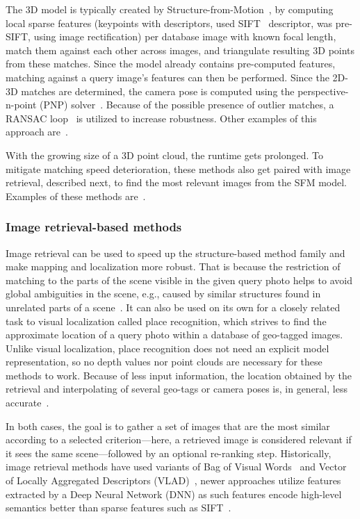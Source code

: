 The 3D model is typically created by
Structure-from-Motion~\citep{SfM, schoenberger2016mvs}, by computing local sparse features (keypoints with descriptors,
\citet{LoweLocalization} used SIFT~\citep{SIFT} descriptor, \citet{PreSIFT} was pre-SIFT, using image rectification)
per database image with known focal length, match them against each other across images, and triangulate resulting 3D points
from these matches. Since the model already contains pre-computed features, matching against
a query image's features can then be performed. Since the 2D-3D matches are determined, the camera pose
is computed using the perspective-n-point (PNP) solver~\citep{PnP}. Because of the possible presence of outlier matches,
a RANSAC loop~\citep{RANSAC} is utilized to increase robustness. Other examples of this approach are~\citet{2D3D, 2D3D_2}.

With the growing size of a 3D point cloud, the runtime gets prolonged. To mitigate matching speed deterioration,
these methods also get paired with image retrieval, described next, to find the most
relevant images from the SFM model. Examples of these methods
are~\citet{InLoc, InLocRevisited, MegLoc}.

\subsubsection*{Image retrieval-based methods}

Image retrieval can be used to speed up the structure-based method family and make mapping
and localization more robust. That is because the restriction of matching to the parts of the scene visible in the given query photo
helps to avoid global ambiguities in the scene, e.g., caused by similar structures found in unrelated parts
of a scene~\citep{InLocRevisited}. It can also be used on its own for a closely related task to visual
localization called place recognition, which strives to find the approximate location of a query photo within a database
of geo-tagged images. Unlike visual localization, place recognition
does not need an explicit model representation, so no depth values nor point clouds are necessary for these
methods to work. Because of less input information, the location obtained by the retrieval and interpolating of several geo-tags
or camera poses is, in general, less accurate~\citep{InterpolationRetrieval, RegressionPose}.

In both cases, the goal is to gather a set of images that are the most similar according to a selected
criterion---here, a retrieved image is considered relevant if it sees the same scene---followed by an
optional re-ranking step. Historically, image retrieval methods have used variants of Bag of Visual Words~\citep{BoVW}
and Vector of Locally Aggregated Descriptors (VLAD)~\citep{VLAD},
newer approaches utilize features extracted by a Deep Neural Network (DNN) as such features encode high-level semantics
better than sparse features such as SIFT~\citep{RetrievalEE, DNNRegression, hausler2021patchnetvlad}.

